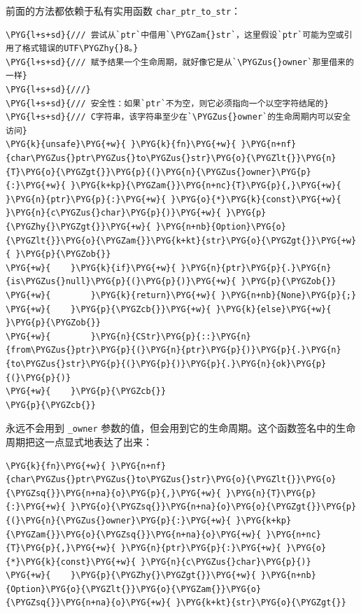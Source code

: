 前面的方法都依赖于私有实用函数 \texttt{char\_ptr\_to\_str}：

\begin{Verbatim}[commandchars=\\\{\},breaklines=true,breakanywhere=true,fontsize=\codefont,xleftmargin=17bp]
\PYG{l+s+sd}{/// 尝试从`ptr`中借用`\PYGZam{}str`，这里假设`ptr`可能为空或引用了格式错误的UTF\PYGZhy{}8。}
\PYG{l+s+sd}{/// 赋予结果一个生命周期，就好像它是从`\PYGZus{}owner`那里借来的一样}
\PYG{l+s+sd}{///}
\PYG{l+s+sd}{/// 安全性：如果`ptr`不为空，则它必须指向一个以空字符结尾的}
\PYG{l+s+sd}{/// C字符串，该字符串至少在`\PYGZus{}owner`的生命周期内可以安全访问}
\PYG{k}{unsafe}\PYG{+w}{ }\PYG{k}{fn}\PYG{+w}{ }\PYG{n+nf}{char\PYGZus{}ptr\PYGZus{}to\PYGZus{}str}\PYG{o}{\PYGZlt{}}\PYG{n}{T}\PYG{o}{\PYGZgt{}}\PYG{p}{(}\PYG{n}{\PYGZus{}owner}\PYG{p}{:}\PYG{+w}{ }\PYG{k+kp}{\PYGZam{}}\PYG{n+nc}{T}\PYG{p}{,}\PYG{+w}{ }\PYG{n}{ptr}\PYG{p}{:}\PYG{+w}{ }\PYG{o}{*}\PYG{k}{const}\PYG{+w}{ }\PYG{n}{c\PYGZus{}char}\PYG{p}{)}\PYG{+w}{ }\PYG{p}{\PYGZhy{}\PYGZgt{}}\PYG{+w}{ }\PYG{n+nb}{Option}\PYG{o}{\PYGZlt{}}\PYG{o}{\PYGZam{}}\PYG{k+kt}{str}\PYG{o}{\PYGZgt{}}\PYG{+w}{ }\PYG{p}{\PYGZob{}}
\PYG{+w}{    }\PYG{k}{if}\PYG{+w}{ }\PYG{n}{ptr}\PYG{p}{.}\PYG{n}{is\PYGZus{}null}\PYG{p}{(}\PYG{p}{)}\PYG{+w}{ }\PYG{p}{\PYGZob{}}
\PYG{+w}{        }\PYG{k}{return}\PYG{+w}{ }\PYG{n+nb}{None}\PYG{p}{;}
\PYG{+w}{    }\PYG{p}{\PYGZcb{}}\PYG{+w}{ }\PYG{k}{else}\PYG{+w}{ }\PYG{p}{\PYGZob{}}
\PYG{+w}{        }\PYG{n}{CStr}\PYG{p}{::}\PYG{n}{from\PYGZus{}ptr}\PYG{p}{(}\PYG{n}{ptr}\PYG{p}{)}\PYG{p}{.}\PYG{n}{to\PYGZus{}str}\PYG{p}{(}\PYG{p}{)}\PYG{p}{.}\PYG{n}{ok}\PYG{p}{(}\PYG{p}{)}
\PYG{+w}{    }\PYG{p}{\PYGZcb{}}
\PYG{p}{\PYGZcb{}}
\end{Verbatim}

永远不会用到 \texttt{\_owner} 参数的值，但会用到它的生命周期。这个函数签名中的生命周期把这一点显式地表达了出来：

\begin{Verbatim}[commandchars=\\\{\},breaklines=true,breakanywhere=true,fontsize=\codefont,xleftmargin=17bp]
\PYG{k}{fn}\PYG{+w}{ }\PYG{n+nf}{char\PYGZus{}ptr\PYGZus{}to\PYGZus{}str}\PYG{o}{\PYGZlt{}}\PYG{o}{\PYGZsq{}}\PYG{n+na}{o}\PYG{p}{,}\PYG{+w}{ }\PYG{n}{T}\PYG{p}{:}\PYG{+w}{ }\PYG{o}{\PYGZsq{}}\PYG{n+na}{o}\PYG{o}{\PYGZgt{}}\PYG{p}{(}\PYG{n}{\PYGZus{}owner}\PYG{p}{:}\PYG{+w}{ }\PYG{k+kp}{\PYGZam{}}\PYG{o}{\PYGZsq{}}\PYG{n+na}{o}\PYG{+w}{ }\PYG{n+nc}{T}\PYG{p}{,}\PYG{+w}{ }\PYG{n}{ptr}\PYG{p}{:}\PYG{+w}{ }\PYG{o}{*}\PYG{k}{const}\PYG{+w}{ }\PYG{n}{c\PYGZus{}char}\PYG{p}{)}
\PYG{+w}{    }\PYG{p}{\PYGZhy{}\PYGZgt{}}\PYG{+w}{ }\PYG{n+nb}{Option}\PYG{o}{\PYGZlt{}}\PYG{o}{\PYGZam{}}\PYG{o}{\PYGZsq{}}\PYG{n+na}{o}\PYG{+w}{ }\PYG{k+kt}{str}\PYG{o}{\PYGZgt{}}
\end{Verbatim}

